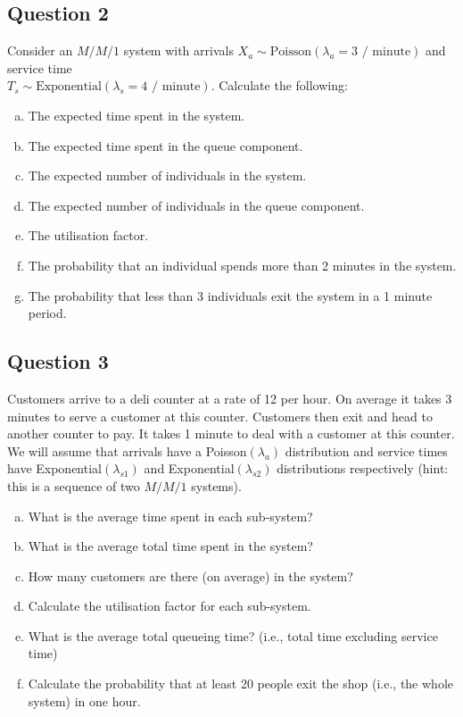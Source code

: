 \documentclass[]{report}
\begin{document}
\subsection*{Question 2}
Consider an $M/M/1$ system with arrivals $X_a \sim \text{Poisson}(\lambda_a=3 \text{ / minute})$ and service time \\$T_s \sim \text{Exponential}(\lambda_s=4 \text{ / minute})$. Calculate the following:\\[-0.2cm]
\begin{enumerate}[(a)]

\item  The expected time spent in the system.  \item  The expected time spent in the queue component.  \item  The expected number of individuals in the system.   \item  The expected number of individuals in the queue component.  \item  The utilisation factor.  \item  The probability that an individual spends more than 2 minutes in the system.  \item  The probability that less than 3 individuals exit the system in a 1 minute period.
\end{enumerate}



\newpage
\subsection*{Question 3}
Customers arrive to a deli counter at a rate of 12 per hour. On average it takes 3 minutes to serve a customer at this counter. Customers then exit and head to another counter to pay. It takes 1 minute to deal with a customer at this counter. We will assume that arrivals have a Poisson$(\lambda_a)$ distribution and service times have Exponential$(\lambda_{s1})$ and Exponential$(\lambda_{s2})$ distributions respectively (hint: this is a sequence of two $M/M/1$ systems).\\[-0.2cm]

\begin{enumerate}[(a)]
\item  What is the average time spent in each sub-system?  \item  What is the average total time spent in the system?  \item  How many customers are there (on average) in the system?   \\\item  Calculate the utilisation factor for each sub-system.  \item  What is the average total queueing time? (i.e., total time excluding service time)  \item  Calculate the probability that at least 20 people exit the shop (i.e., the whole system) in one hour.
\end{enumerate}
\end{document}
